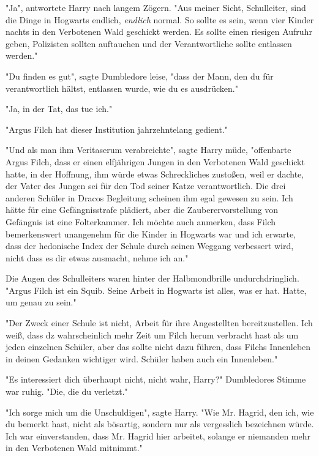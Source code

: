 {"Ja", antwortete Harry nach langem Zögern. "Aus meiner Sicht, Schulleiter, sind die Dinge in Hogwarts endlich, \emph{endlich} normal. So sollte es sein, wenn vier Kinder nachts in den Verbotenen Wald geschickt werden. Es sollte einen riesigen Aufruhr geben, Polizisten sollten auftauchen und der Verantwortliche sollte entlassen werden."

"Du finden es gut", sagte Dumbledore leise, "dass der Mann, den du für verantwortlich hältst, entlassen wurde, wie du es ausdrücken."

"Ja, in der Tat, das tue ich."

"Argus Filch hat dieser Institution jahrzehntelang gedient."

"Und als man ihm Veritaserum verabreichte", sagte Harry müde, "offenbarte Argus Filch, dass er einen elfjährigen Jungen in den Verbotenen Wald geschickt hatte, in der Hoffnung, ihm würde etwas Schreckliches zustoßen, weil er dachte, der Vater des Jungen sei für den Tod seiner Katze verantwortlich. Die drei anderen Schüler in Dracos Begleitung scheinen ihm egal gewesen zu sein. Ich hätte für eine Gefängnisstrafe plädiert, aber die Zauberervorstellung von Gefängnis ist eine Folterkammer. Ich möchte auch anmerken, dass Filch bemerkenswert unangenehm für die Kinder in Hogwarts war und ich erwarte, dass der hedonische Index der Schule durch seinen Weggang verbessert wird, nicht dass es dir etwas ausmacht, nehme ich an."

Die Augen des Schulleiters waren hinter der Halbmondbrille undurchdringlich.\\ "Argus Filch ist ein Squib. Seine Arbeit in Hogwarts ist alles, was er hat. Hatte, um genau zu sein."

"Der Zweck einer Schule ist nicht, Arbeit für ihre Angestellten bereitzustellen. Ich weiß, dass dz wahrscheinlich mehr Zeit um Filch herum verbracht hast als um jeden einzelnen Schüler, aber das sollte nicht dazu führen, dass Filchs Innenleben in deinen Gedanken wichtiger wird. Schüler haben auch ein Innenleben."

"Es interessiert dich überhaupt nicht, nicht wahr, Harry?" Dumbledores Stimme war ruhig. "Die, die du verletzt."

"Ich sorge mich um die Unschuldigen", sagte Harry. "Wie Mr. Hagrid, den ich, wie du bemerkt hast, nicht als bösartig, sondern nur als vergesslich bezeichnen würde.\\ Ich war einverstanden, dass Mr. Hagrid hier arbeitet, solange er niemanden mehr in den Verbotenen Wald mitnimmt."

}
